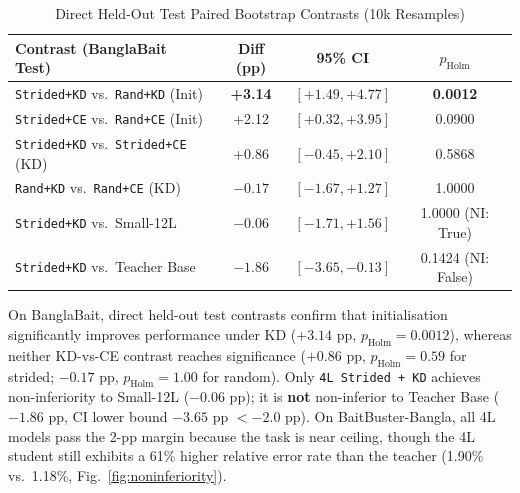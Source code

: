 \documentclass[conference]{IEEEtran}
\begin{document}
\begin{table}[htbp]
\caption{Direct Held-Out Test Paired Bootstrap Contrasts (10k Resamples)}
\label{tab:contrasts}
\begin{center}
\begin{tabular}{lccc}
\toprule
\textbf{Contrast (BanglaBait Test)} & \textbf{Diff (pp)} & \textbf{95\% CI} & \textbf{$p_{\text{Holm}}$} \\
\midrule
\texttt{Strided+KD} vs.\ \texttt{Rand+KD} (Init) & \textbf{+3.14} & $[+1.49, +4.77]$ & \textbf{0.0012} \\
\texttt{Strided+CE} vs.\ \texttt{Rand+CE} (Init) & +2.12 & $[+0.32, +3.95]$ & 0.0900 \\
\texttt{Strided+KD} vs.\ \texttt{Strided+CE} (KD) & +0.86 & $[-0.45, +2.10]$ & 0.5868 \\
\texttt{Rand+KD} vs.\ \texttt{Rand+CE} (KD) & $-0.17$ & $[-1.67, +1.27]$ & 1.0000 \\
\texttt{Strided+KD} vs.\ Small-12L & $-0.06$ & $[-1.71, +1.56]$ & 1.0000 (NI: True) \\
\texttt{Strided+KD} vs.\ Teacher Base & $-1.86$ & $[-3.65, -0.13]$ & 0.1424 (NI: False) \\
\bottomrule
\end{tabular}
\end{center}
\end{table}

On BanglaBait, direct held-out test contrasts confirm that initialisation significantly improves performance under KD ($+3.14$ pp, $p_{\text{Holm}}=0.0012$), whereas neither KD-vs-CE contrast reaches significance ($+0.86$ pp, $p_{\text{Holm}}=0.59$ for strided; $-0.17$ pp, $p_{\text{Holm}}=1.00$ for random). Only \texttt{4L Strided + KD} achieves non-inferiority to Small-12L ($-0.06$ pp); it is \textbf{not} non-inferior to Teacher Base ($-1.86$ pp, CI lower bound $-3.65$ pp $< -2.0$ pp). On BaitBuster-Bangla, all 4L models pass the 2-pp margin because the task is near ceiling, though the 4L student still exhibits a 61\% higher relative error rate than the teacher (1.90\% vs.\ 1.18\%, Fig.~\ref{fig:noninferiority}).
\end{document}
